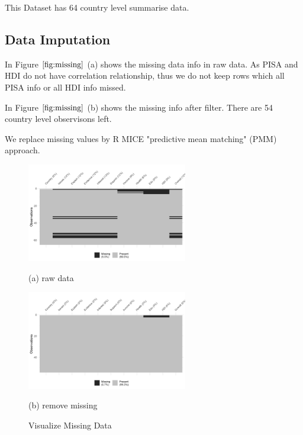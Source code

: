 \documentclass[12pt]{article}
\begin{document}
This Dataset has 64 country level summarise data.


\subsection{Data Imputation}
\label{ss.imputation}

In Figure $\ref{fig:missing}$ (a) shows the missing data info in raw data.
As PISA and HDI do not have correlation relationship, 
thus we do not keep rows which all PISA info or all HDI info missed.

In Figure $\ref{fig:missing}$ (b) shows the missing info after filter.
There are 54 country level observisons left.

We replace missing values by R MICE "predictive mean matching" (PMM) approach.


\label{ss.imputataion}

\begin{figure}[htb]
  \begin{minipage}[b]{1.0\linewidth}
    \centering
    \centerline{\includegraphics[width=7.0cm]{images/null_1}}
    \centerline{(a) raw data}\medskip
  \end{minipage}
  \hfill
  \begin{minipage}[b]{1.0\linewidth}
    \centering
    \centerline{\includegraphics[width=7.0cm]{images/null_2}}
    \centerline{(b) remove missing }\medskip
  \end{minipage}
  \caption{Visualize Missing Data}
  \label{fig:missing}
  \end{figure}
\end{document}
